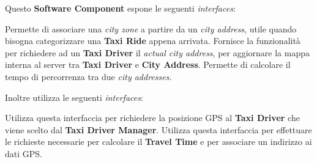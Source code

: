 \begin{itemize}
\begin{itemize}
		 Questo \textbf{Software Component} espone le seguenti \textit{interfaces}:
		\begin{itemize}
			 Permette di associare una \textit{city zone} a partire da un \textit{city address}, utile quando bisogna categorizzare una \textbf{Taxi Ride} appena arrivata.
			 Fornisce la funzionalità per richiedere ad un \textbf{Taxi Driver} il \textit{actual city address}, per aggiornare la mappa interna al server tra \textbf{Taxi Driver} e \textbf{City Address}.
			 Permette di calcolare il tempo di percorrenza tra due \textit{city addresses}.
		\end{itemize}
		Inoltre utilizza le seguenti \textit{interfaces}:
		\begin{itemize}
			 Utilizza questa interfaccia per richiedere la posizione GPS al \textbf{Taxi Driver} che viene scelto dal \textbf{Taxi Driver Manager}.
			 Utilizza questa interfaccia per effettuare le richieste necessarie per calcolare il \textbf{Travel Time} e per associare un indirizzo ai dati GPS.	
		\end{itemize}
		

\end{itemize}
\end{itemize}
